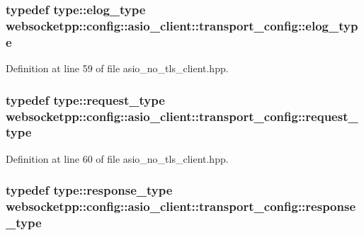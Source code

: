 \subsubsection[{elog\+\_\+type}]{\setlength{\rightskip}{0pt plus 5cm}typedef {\bf type\+::elog\+\_\+type} {\bf websocketpp\+::config\+::asio\+\_\+client\+::transport\+\_\+config\+::elog\+\_\+type}}\label{structwebsocketpp_1_1config_1_1asio__client_1_1transport__config_a9c944b91c2196a8ce6d37c82fc97ef6a}


Definition at line 59 of file asio\+\_\+no\+\_\+tls\+\_\+client.\+hpp.

\hypertarget{structwebsocketpp_1_1config_1_1asio__client_1_1transport__config_aebeda57b20f9cf83ff7edf1991ccbe25}{}
\subsubsection[{request\+\_\+type}]{\setlength{\rightskip}{0pt plus 5cm}typedef {\bf type\+::request\+\_\+type} {\bf websocketpp\+::config\+::asio\+\_\+client\+::transport\+\_\+config\+::request\+\_\+type}}\label{structwebsocketpp_1_1config_1_1asio__client_1_1transport__config_aebeda57b20f9cf83ff7edf1991ccbe25}


Definition at line 60 of file asio\+\_\+no\+\_\+tls\+\_\+client.\+hpp.

\hypertarget{structwebsocketpp_1_1config_1_1asio__client_1_1transport__config_a059b73720e41d697f2a3731519f36e38}{}
\subsubsection[{response\+\_\+type}]{\setlength{\rightskip}{0pt plus 5cm}typedef {\bf type\+::response\+\_\+type} {\bf websocketpp\+::config\+::asio\+\_\+client\+::transport\+\_\+config\+::response\+\_\+type}}\label{structwebsocketpp_1_1config_1_1asio__client_1_1transport__config_a059b73720e41d697f2a3731519f36e38}


